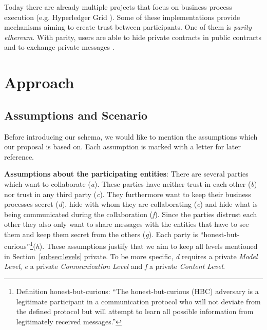 \documentclass[runningheads]{llncs}
\newcommand{\comment}[1]{}
\newcommand{\ber}[1]{\textit{#1}}
\newcommand{\refsec}[1]{Section~\ref{#1}}
\renewcommand{\bigbreak}{}
\newcommand{\quotel}{``}
\newcommand{\quoter}{''}
\begin{document}
Today there are already multiple projects that focus on business process execution (e.g. Hyperledger Grid \cite{hyperledger}). Some of these implementations provide mechanisms aiming to create trust between participants. One of them is \textit{parity ethereum}. With parity, users are able to hide private contracts in public contracts and to exchange private messages \cite{parity}.

\comment{However for private contract execution parity is relying on validators,  \quotel  account[s] that can allow a private contract’s state [to] change \quoter   \cite{parity}. In our understanding this makes parity insufficient for untrusted business execution, since, like private blockchains, it requires trust in one or multiple nodes. 
}




\section{Approach} \label{sec:approach}

\subsection{Assumptions and Scenario} \label{subsec:assumptions}

Before introducing our schema, we would like to mention the assumptions which our proposal is based on. Each assumption is marked with a letter for later reference. 



\bigbreak
\textbf{Assumptions about the participating entities}: There are several parties which want to collaborate (\ber{a}). These parties have neither trust in each other (\ber{b}) nor  trust in any third party (\ber{c}). They furthermore want to keep their business processes secret (\ber{d}),  hide with whom they are collaborating (\ber{e}) and  hide what is being communicated during the collaboration (\ber{f}). Since the parties distrust each other they also  only want to share messages with the entities that have to see them and keep them secret from the others (\ber{g}). Each party  is  \quotel  honest-but-curious\quoter  \footnote{Definition honest-but-curious:  \quotel The honest-but-curious (HBC) adversary is a legitimate participant in a communication protocol who will not deviate from the defined protocol but will attempt to learn all possible information from legitimately received messages.\quoter \cite{paverd2014modelling}}(\ber{h}). These assumptions justify that we aim to keep all levels mentioned in \refsec{subsec:levels} private. To be more specific, \ber{d} requires a private \ber{Model Level}, \ber{e} a private \ber{Communication Level} and \ber{f} a private  \ber{Content Level}.
\end{document}
